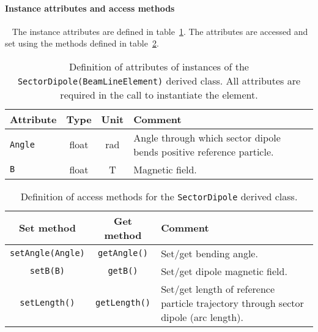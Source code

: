 \paragraph{Instance attributes and access methods} ~\newline
\label{SubSubSect:SDpl:InstAttr}
\noindent
The instance attributes are defined in
table~\ref{Tab:SDpl:Attributes}. 
The attributes are accessed and set using the methods defined in
table~\ref{Tab:SDpl:Methods}.
\begin{table}[h]
  \caption{
    Definition of attributes of instances of
    the \texttt{SectorDipole(BeamLineElement)} derived class.
    All attributes are required in the call to instantiate the
    element.
  }
  \label{Tab:SDpl:Attributes}
  \begin{center}
    \begin{tabular}{|l|c|c|p{10cm}|}
      \hline
      \textbf{Attribute}   & \textbf{Type} & \textbf{Unit} & \textbf{Comment}                      \\
      \hline
      \texttt{Angle}   & float & rad & Angle through which sector dipole bends positive reference
                                 particle.                                                         \\
      \texttt{B}       & float & T   & Magnetic field.                                             \\
      \hline
    \end{tabular}
  \end{center}
\end{table}
\begin{table}[h]
  \caption{
    Definition of access methods for the \texttt{SectorDipole} derived
    class. 
  }
  \label{Tab:SDpl:Methods}
  \begin{center}
    \begin{tabular}{|c|c|p{7cm}|}
      \hline
      \textbf{Set method} & \textbf{Get method}  & \textbf{Comment}       \\
      \hline
      \texttt{setAngle(Angle)}     & \texttt{getAngle()}  & Set/get bending angle.         \\
      \texttt{setB(B)}             & \texttt{getB()}      & Set/get dipole magnetic field. \\
      \texttt{setLength()}         & \texttt{getLength()} & Set/get length of reference
                                                            particle trajectory through
                                                            sector dipole (arc length).    \\
      \hline
    \end{tabular}
  \end{center}
\end{table}

